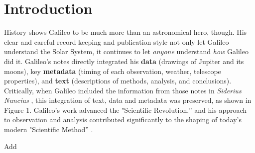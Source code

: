 \section{Introduction}
History shows Galileo to be much more than an
astronomical hero, though. His clear and careful record keeping and
publication style not only let Galileo understand the Solar System, it
continues to let \emph{anyone} understand \emph{how} Galileo did it.
Galileo's notes directly integrated his \textbf{data} (drawings of
Jupiter and its moons), key \textbf{metadata} (timing of each
observation, weather, telescope properties), and \textbf{text}
(descriptions of methods, analysis, and conclusions). Critically, when
Galileo included the information from those notes in \emph{Siderius
Nuncius} \cite{galilei}, this integration of text, data and metadata was
preserved, as shown in Figure 1. Galileo's work advanced the
"Scientific Revolution,'' and his approach to observation and analysis
contributed significantly to the shaping of today's modern "Scientific
Method'' \cite{galilei1618assayer,galilei1957discoveries}.

Add \cite{Liberzon_2006}